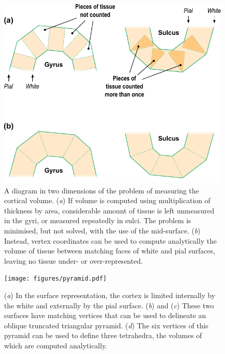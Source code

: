 \begin{figure}[!tp]
\begin{center}
\includegraphics[scale=.9]{figures/mantle.pdf}
\caption[A \textsc{2-d} diagram of the problem of measuring the cortical volume.]{A diagram in two dimensions of the problem of measuring the cortical volume. (\emph{a}) If volume is computed using multiplication of thickness by area, considerable amount of tissue is left unmeasured in the gyri, or measured repeatedly in sulci. The problem is minimised, but not solved, with the use of the mid-surface. (\emph{b}) Instead, vertex coordinates can be used to compute analytically the volume of tissue between matching faces of white and pial surfaces, leaving no tissue under- or over-represented.}
\label{fig:mantle} 
\end{center}
\end{figure}

\begin{figure}[!tp]
\begin{center}
\texttt{[image: figures/pyramid.pdf]}
\caption[A \textsc{3-d} diagram with the proposed solution to measure the cortical volume.]{(\emph{a}) In the surface representation, the cortex is limited internally by the white and externally by the pial surface. (\emph{b}) and (\emph{c}) These two surfaces have matching vertices that can be used to delineate an oblique truncated triangular pyramid. (\emph{d}) The six vertices of this pyramid can be used to define three tetrahedra, the volumes of which are computed analytically.}
\label{fig:pyramid}
\end{center}
\end{figure}

